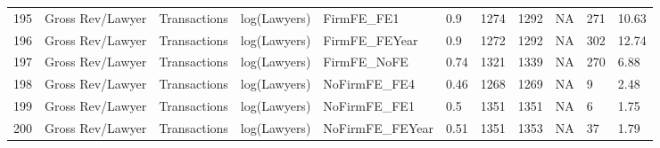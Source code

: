 \documentclass{article}
\begin{document}
\begin{table}[H]
\begin{tabular}{rllllllllll}
  195 & Gross Rev/Lawyer & Transactions & log(Lawyers) & FirmFE\_FE1 & 0.9 & 1274 & 1292 & NA & 271 & 10.63 \\
  196 & Gross Rev/Lawyer & Transactions & log(Lawyers) & FirmFE\_FEYear & 0.9 & 1272 & 1292 & NA & 302 & 12.74 \\
  197 & Gross Rev/Lawyer & Transactions & log(Lawyers) & FirmFE\_NoFE & 0.74 & 1321 & 1339 & NA & 270 & 6.88 \\
  198 & Gross Rev/Lawyer & Transactions & log(Lawyers) & NoFirmFE\_FE4 & 0.46 & 1268 & 1269 & NA & 9 & 2.48 \\
  199 & Gross Rev/Lawyer & Transactions & log(Lawyers) & NoFirmFE\_FE1 & 0.5 & 1351 & 1351 & NA & 6 & 1.75 \\
  200 & Gross Rev/Lawyer & Transactions & log(Lawyers) & NoFirmFE\_FEYear & 0.51 & 1351 & 1353 & NA & 37 & 1.79 \\
   \hline
\end{tabular}
\end{table}
\end{document}
